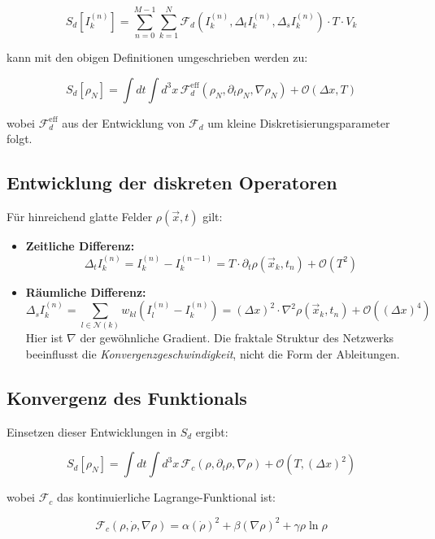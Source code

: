 \[
S_d[I_k^{(n)}] = \sum_{n=0}^{M-1} \sum_{k=1}^N \mathcal{F}_d(I_k^{(n)}, \Delta_t I_k^{(n)},
\Delta_s I_k^{(n)}) \cdot T \cdot V_k
\]

kann mit den obigen Definitionen umgeschrieben werden zu:

\[
S_d[\rho_N] = \int dt \int d^3x \, \mathcal{F}_d^{\text{eff}}(\rho_N, \partial_t \rho_N,
\nabla \rho_N) + \mathcal{O}(\Delta x, T)
\]

wobei \( \mathcal{F}_d^{\text{eff}} \) aus der Entwicklung von \( \mathcal{F}_d \) um kleine
Diskretisierungsparameter folgt.

\subsection{Entwicklung der diskreten Operatoren}
\label{sub:kontinuumslimes_operatoren_entwicklung}

Für hinreichend glatte Felder \( \rho(\vec{x}, t) \) gilt:

\begin{itemize}
    \item \textbf{Zeitliche Differenz:}
          \[
          \Delta_t I_k^{(n)} = I_k^{(n)} - I_k^{(n-1)} = T \cdot \partial_t \rho(\vec{x}_k, t_n) + \mathcal{O}(T^2)
          \]

    \item \textbf{Räumliche Differenz:}
          \[
          \Delta_s I_k^{(n)} = \sum_{l \in \mathcal{N}(k)} w_{kl}(I_l^{(n)} - I_k^{(n)})
          = (\Delta x)^2 \cdot \nabla^2 \rho(\vec{x}_k, t_n) + \mathcal{O}((\Delta x)^4)
          \]
          Hier ist \( \nabla \) der gewöhnliche Gradient. Die fraktale Struktur
          des Netzwerks beeinflusst die \emph{Konvergenzgeschwindigkeit}, nicht
          die Form der Ableitungen.
\end{itemize}

\subsection{Konvergenz des Funktionals}
\label{sub:kontinuumslimes_funktional_grenzwert}

Einsetzen dieser Entwicklungen in \( S_d \) ergibt:

\[
S_d[\rho_N] = \int dt \int d^3x \, \mathcal{F}_c(\rho, \partial_t \rho, \nabla \rho) +
\mathcal{O}(T, (\Delta x)^2)
\]

wobei \( \mathcal{F}_c \) das kontinuierliche Lagrange-Funktional ist:

\[
\mathcal{F}_c(\rho, \dot{\rho}, \nabla \rho) = \alpha(\dot{\rho})^2 + \beta(\nabla \rho)^2 +
\gamma \rho \ln \rho
\]


